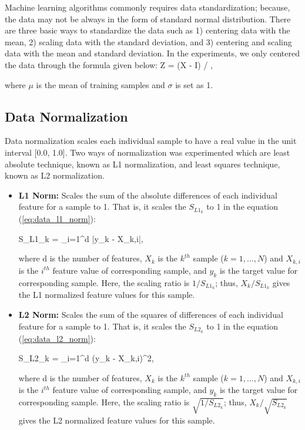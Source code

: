 Machine learning algorithms commonly requires data standardization; because, the data may not be always in the form of standard normal distribution. There are three basic ways to standardize the data such as 1) centering data with the mean, 2) scaling data with the standard deviation, and 3) centering and scaling data with the mean and standard deviation. In the experiments, we only centered the data through the formula given below:
\be
\label{eq:data_standardization}
Z = (X - \mu * I) / \sigma\:,
\ee

where $\mu$ is the mean of training samples and $\sigma$ is set as 1. 


\subsection{Data Normalization}

Data normalization scales each individual sample to have a real value in the unit interval [0.0, 1.0]. Two ways of normalization was experimented which are least absolute technique, known as L1 normalization, and least squares technique, known as L2 normalization.

\begin{itemize}
    \item \textbf{L1 Norm:} Scales the sum of the absolute differences of each individual feature for a sample to 1. That is, it scales the $S_{{L1}_{k}}$ to 1 in the equation (\ref{eq:data_l1_norm}):
    
    \be
    \label{eq:data_l1_norm}
    S_{{L1}_{k}} = \sum_{i=1}^{d} \big|y_{k} - X_{k,i}\big|\:,
    \ee
    
    where d is the number of features, $X_{k}$ is the $k^{th}$ sample ($k=1,\ldots,N$) and $X_{k,i}$ is the $i^{th}$ feature value of corresponding sample, and $y_{k}$ is the target value for corresponding sample. Here, the scaling ratio is $1 / S_{{L1}_{k}}$; thus, $X_{k} / S_{{L1}_{k}}$ gives the L1 normalized feature values for this sample.
    
    \item \textbf{L2 Norm:} Scales the sum of the squares of differences of each individual feature for a sample to 1. That is, it scales the $S_{{L2}_{k}}$ to 1 in the equation (\ref{eq:data_l2_norm}):
    
    \be
    \label{eq:data_l2_norm}
    S_{{L2}_{k}} = \sum_{i=1}^{d} \big(y_{k} - X_{k,i}\big)^{2}\:,
    \ee
    
    where d is the number of features, $X_{k}$ is the $k^{th}$ sample ($k=1,\ldots,N$) and $X_{k,i}$ is the $i^{th}$ feature value of corresponding sample, and $y_{k}$ is the target value for corresponding sample. Here, the scaling ratio is $\sqrt{1 / S_{{L2}_{k}}}$; thus, $X_{k} / \sqrt{S_{{L2}_{k}}}$ gives the L2 normalized feature values for this sample.
\end{itemize}

